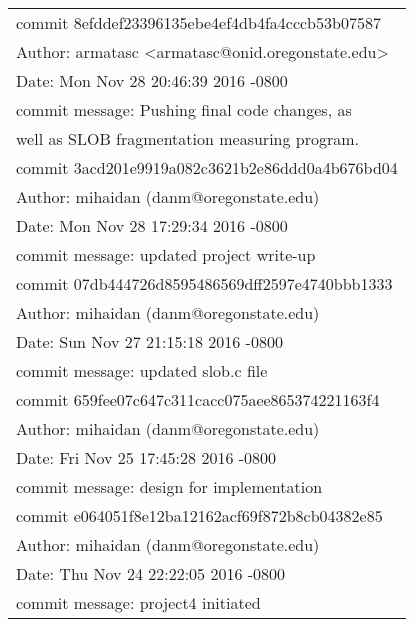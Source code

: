 \documentclass[letterpaper,10pt,onecolumn]{IEEEtran}
\begin{document}
        \begin{center}
        \def\arraystretch{1.1}
        \begin{tabular}{ | p{8.2cm} | }
            \hline
            commit 8efddef23396135ebe4ef4db4fa4cccb53b07587 \\
            Author: armatasc <armatasc@onid.oregonstate.edu> \\
            Date:   Mon Nov 28 20:46:39 2016 -0800 \\ 
            commit message: Pushing final code changes, as \\ 
            well as SLOB fragmentation measuring program. \\
            \hline
            commit 3acd201e9919a082c3621b2e86ddd0a4b676bd04 \\
            Author: mihaidan (danm@oregonstate.edu) \\
            Date:   Mon Nov 28 17:29:34 2016 -0800 \\
            commit message: updated project write-up \\
            \hline
            commit 07db444726d8595486569dff2597e4740bbb1333 \\
            Author: mihaidan (danm@oregonstate.edu) \\
            Date:   Sun Nov 27 21:15:18 2016 -0800 \\
            commit message: updated slob.c file \\
            \hline
            commit 659fee07c647c311cacc075aee865374221163f4 \\
            Author: mihaidan (danm@oregonstate.edu) \\ 
            Date:   Fri Nov 25 17:45:28 2016 -0800 \\
            commit message: design for implementation \\
            \hline
            commit e064051f8e12ba12162acf69f872b8cb04382e85 \\
            Author: mihaidan (danm@oregonstate.edu) \\
            Date:   Thu Nov 24 22:22:05 2016 -0800 \\
            commit message: project4 initiated \\
            \hline
        \end{tabular}
        \end{center}


    
    \vspace{6mm}
    
\end{document}
